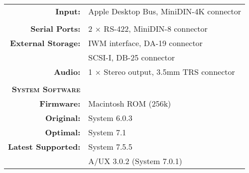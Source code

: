 \begin{tabular}{ r p{6in} }
\textbf{Input:} & Apple Desktop Bus, MiniDIN-4K connector \\
\\
\textbf{Serial Ports:} & 2 \(\times\) RS-422, MiniDIN-8 connector \\
\textbf{External Storage:} & IWM interface, DA-19 connector \\
~ & SCSI-I, DB-25 connector \\
\textbf{Audio:} & 1 \(\times\) Stereo output, 3.5mm TRS connector \\
\\
\textbf{\textsc{System Software}} & ~ \\
\textbf{Firmware:} & Macintosh ROM (256k) \\
\textbf{Original:} & System 6.0.3 \\
\textbf{Optimal:} & System 7.1 \\
\textbf{Latest Supported:} & System 7.5.5 \\
~ & A/UX 3.0.2 (System 7.0.1) \\
\end{tabular}
